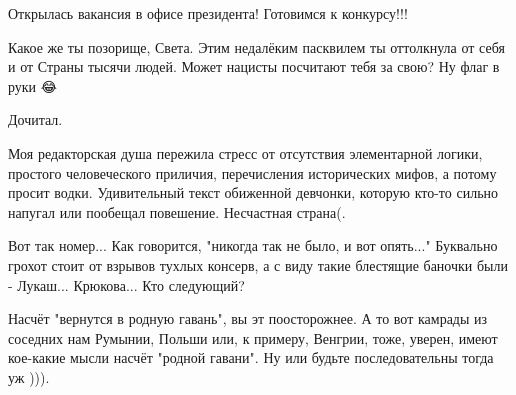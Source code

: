 \begin{itemize}
 
Открылась вакансия в офисе президента! Готовимся к конкурсу!!!

 
Какое же ты позорище, Света. Этим недалёким пасквилем ты оттолкнула от себя и от Страны тысячи людей. Может нацисты посчитают тебя за свою? Ну флаг в руки 😂

 

Дочитал.

Моя редакторская душа пережила стресс от отсутствия элементарной логики,
простого человеческого приличия, перечисления исторических мифов, а потому
просит водки. Удивительный текст обиженной девчонки, которую кто-то сильно
напугал или пообещал повешение. Несчастная страна(.


 

Вот так номер... Как говорится, "никогда так не было, и вот опять..." Буквально
грохот стоит от взрывов тухлых консерв, а с виду такие блестящие баночки были -
Лукаш... Крюкова... Кто следующий?

 

Насчёт "вернутся в родную гавань", вы эт поосторожнее. А то вот камрады из
соседних нам Румынии, Польши или, к примеру, Венгрии, тоже, уверен, имеют
кое-какие мысли насчёт "родной гавани". Ну или будьте последовательны тогда уж
))).



\end{itemize}
